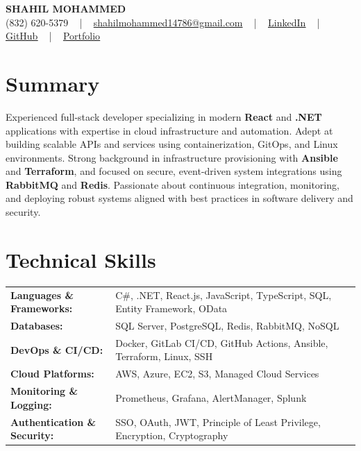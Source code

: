 \documentclass[letterpaper,11pt]{article}
\begin{document}
\begin{center}
    {\fontsize{14pt}{12pt}\selectfont \textbf{\MakeUppercase{Shahil Mohammed}}}\\ \vspace{2pt}
    \fontsize{10pt}{12pt}\selectfont (832) 620-5379 ~ | ~ \href{mailto:shahilmohammed14786@gmail.com}{shahilmohammed14786@gmail.com} ~ | ~  
    \href{https://www.linkedin.com/in/shahil-mohammed-9652931a1/}{\color{blue}\underline{LinkedIn}}  ~ | ~ 
    \href{https://github.com/freakbeast14}{\color{blue}\underline{GitHub}} ~ | ~ 
    \href{https://shahil-mohammed.netlify.app/}{\color{blue}\underline{Portfolio}}
    \vspace{-8pt}
\end{center}

\section{Summary}
\fontsize{9pt}{10pt}\selectfont
Experienced full-stack developer specializing in modern \textbf{React} and \textbf{.NET} applications with expertise in cloud infrastructure and automation. Adept at building scalable APIs and services using containerization, GitOps, and Linux environments. Strong background in infrastructure provisioning with \textbf{Ansible} and \textbf{Terraform}, and focused on secure, event-driven system integrations using \textbf{RabbitMQ} and \textbf{Redis}. Passionate about continuous integration, monitoring, and deploying robust systems aligned with best practices in software delivery and security.
 \vspace{-5pt}
 
\section{Technical Skills}
        \vspace{-14pt}
        \begin{table}[h]
            \fontsize{9pt}{10pt}\selectfont
            \begin{tabular}{p{0.3\linewidth} p{0.7\linewidth}}
                \textbf{Languages \& Frameworks:} & C\#, .NET, React.js, JavaScript, TypeScript, SQL, Entity Framework, OData \\
                \textbf{Databases:} & SQL Server, PostgreSQL, Redis, RabbitMQ, NoSQL \\
                \textbf{DevOps \& CI/CD:} & Docker, GitLab CI/CD, GitHub Actions, Ansible, Terraform, Linux, SSH \\
                \textbf{Cloud Platforms:} & AWS, Azure, EC2, S3, Managed Cloud Services \\
                \textbf{Monitoring \& Logging:} & Prometheus, Grafana, AlertManager, Splunk \\
                \textbf{Authentication \& Security:} & SSO, OAuth, JWT, Principle of Least Privilege, Encryption, Cryptography \\
            \end{tabular}
        \end{table}
 \vspace{-15pt}
 
\end{document}

